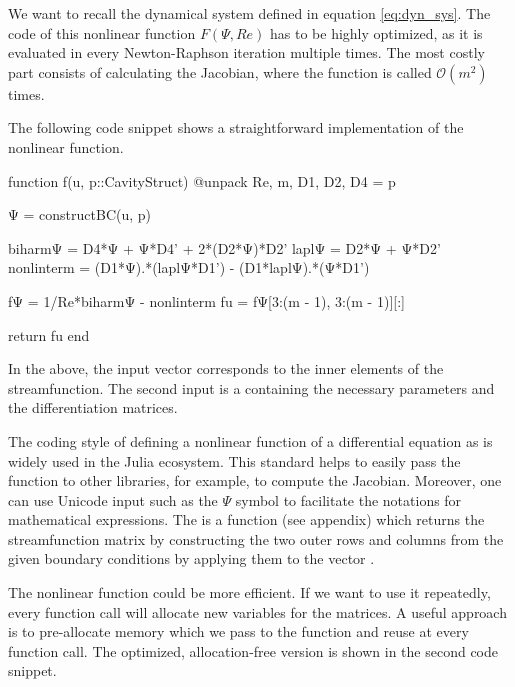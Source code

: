 We want to recall the dynamical system defined in equation \eqref{eq:dyn_sys}.
The code of this nonlinear function $F(\Psi, Re)$ has to be highly optimized,
as it is evaluated in every Newton-Raphson iteration multiple times. The most
costly part consists of calculating the Jacobian, where the function is called
$\mathcal{O}(m^2)$ times.

The following code snippet shows a straightforward implementation of the
nonlinear function. 

\clearpage

\begin{jllisting}[caption=Simple implementation of the nonlinear
  function $F$ in Julia \vspace{3pt}]
function f(u, p::CavityStruct)
    @unpack Re, m, D1, D2, D4 = p

    Ψ = constructBC(u, p)

    biharmΨ = D4*Ψ +  Ψ*D4' + 2*(D2*Ψ)*D2'
    laplΨ = D2*Ψ + Ψ*D2'
    nonlinterm = (D1*Ψ).*(laplΨ*D1') - (D1*laplΨ).*(Ψ*D1')
    
    fΨ = 1/Re*biharmΨ - nonlinterm
    fu = fΨ[3:(m - 1), 3:(m - 1)][:]

    return fu 
end
\end{jllisting}

In the above, the input vector  corresponds to the inner elements of
the streamfunction. The second input  is a  containing
the necessary parameters and the differentiation matrices. 

The coding style of defining a nonlinear function of a differential equation as
 is widely used in the Julia ecosystem. This standard helps to
easily pass the function to other libraries, for example, to compute the
Jacobian. Moreover, one can use Unicode input such as the $\Psi $ symbol to
facilitate the notations for mathematical expressions. The
 is a function (see appendix) which returns the
streamfunction matrix by constructing the two outer rows and columns from the
given boundary conditions by applying them to the vector .

The nonlinear function could be more efficient. If we want to use it
repeatedly, every function call will allocate new variables for the matrices. A
useful approach is to pre-allocate memory which we pass to the function and
reuse at every function call. The optimized, allocation-free version is shown
in the second code snippet. 

